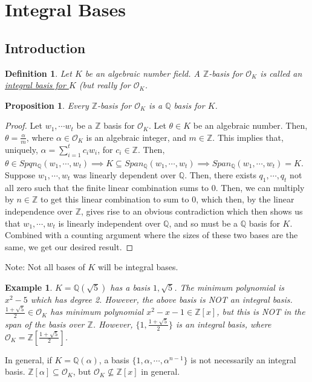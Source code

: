 \documentclass{article}
\newcommand{\air}{\mathcal{O}_K}
\newcommand{\Q}{\mathbb{Q}}
\newcommand{\Z}{\mathbb{Z}}
\newtheorem{example}{Example}[subsection]
\newtheorem{proposition}{Proposition}[subsection]
\newtheorem{definition}{Definition}[subsection]
\begin{document}
\section{Integral Bases}
\subsection{Introduction}
\begin{definition}
Let $K$ be an algebraic number field. A $\Z$-basis for $\mathcal{O}_K$ is called an \underline{integral basis for $K$} (but really for $\mathcal{O}_K$.
\end{definition}
\begin{proposition}
Every $\Z$-basis for $\mathcal{O}_K$ is a $\Q$ basis for $K$. 
\end{proposition}
\begin{proof}
Let $w_1,\cdots w_t$ be a $\Z$ basis for $\mathcal{O}_K$. Let $\theta\in K$ be an algebraic number. Then, $\theta=\frac{\alpha}{m}$, where $\alpha\in\mathcal{O}_K$ is an algebraic integer, and $m\in\Z$. This implies that, uniquely, $\alpha=\displaystyle\sum_{i=1}^tc_iw_i$, for $c_i\in\Z$. Then, $\theta\in Spqn_\Q(w_1,\cdots, w_t)\implies K\subseteq Span_\Q(w_1,\cdots, w_t)\implies Span_\Q(w_1,\cdots, w_t)=K$. Suppose $w_1,\cdots, w_t$ was linearly dependent over $\Q$. Then, there exists $q_1,\cdots, q_t$ not all zero such that the finite linear combination sums to 0. Then, we can multiply by $n\in\Z$ to get this linear combination to sum to 0, which then, by the linear independence over $\Z$, gives rise to an obvious contradiction which then shows us that $w_1,\cdots, w_t$ is linearly independent over $\Q$, and so must be a $\Q$ basis for $K$. Combined with a counting argument where the sizes of these two bases are the same, we get our desired result.
\end{proof}
\noindent Note: Not all bases of $K$ will be integral bases.
\begin{example}
$K=\Q(\sqrt{5})$ has a basis $1,\sqrt{5}$. The minimum polynomial is $x^2-5$ which has degree 2. However, the above basis is NOT an integral basis. $\frac{1+\sqrt{5}}{2}\in\air$ has minimum polynomial $x^2-x-1\in\Z[x]$, but this is NOT in the span of the basis over $\Z$. However, $\{1,\frac{1+\sqrt{5}}{2}\}$ is an integral basis, where $\air =\Z\left[\frac{1+\sqrt{5}}{2}\right]$.
\end{example}
\noindent In general, if $K=\Q(\alpha)$, a basis $\{1,\alpha,\cdots, \alpha^{n-1}\}$ is not necessarily an integral basis. $\Z[\alpha]\subseteq \air$, but $\air\not\subseteq \Z[x]$ in general.
\end{document}
